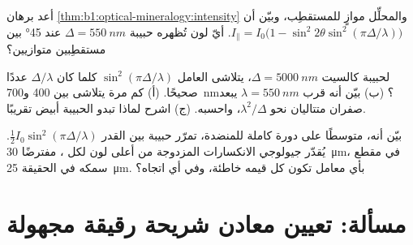 \begin{exercise}[$\star\star\star$]\label{exo:b1:optical-mineralogy:10}
أعد برهان \cref{thm:b1:optical-mineralogy:intensity} والمحلِّل موازٍ للمستقطِب، وبيّن أن
$I_\parallel = I_0\bigl(1 - \sin^2 2\theta\sin^2(\pi\Delta/\lambda)\bigr)$.
أيّ لون تُظهره حبيبة $\Delta = \qty{550}{nm}$ عند \ang{45} بين مستقطِبين متوازيين؟
\end{exercise}

\begin{exercise}[$\star\star\star$]\label{exo:b1:optical-mineralogy:11}
لحبيبة كالسيت $\Delta = \qty{5000}{nm}$، يتلاشى العامل $\sin^2(\pi\Delta/\lambda)$ كلما كان $\Delta/\lambda$ عددًا صحيحًا. (أ) كم مرة يتلاشى بين \num{400} و\qty{700}{nm}؟ (ب) بيّن أنه قرب $\lambda = \qty{550}{nm}$ يبعد صفران متتاليان نحو $\lambda^2/\Delta$، واحسبه. (ج) اشرح لماذا تبدو الحبيبة أبيض تقريبًا.
\end{exercise}

\begin{exercise}[$\star\star\star$]\label{exo:b1:optical-mineralogy:12}
بيّن أنه، متوسطًا على دورة كاملة للمنضدة، تمرّر حبيبة بين  القدر $\frac12 I_0\sin^2(\pi\Delta/\lambda)$. يُقدّر جيولوجي الانكسارات المزدوجة من أعلى لون لكل ، مفترضًا \qty{30}{\micro m}، في مقطع سمكه في الحقيقة \qty{25}{\micro m}. بأي معامل تكون كل قيمه خاطئة، وفي أي اتجاه؟
\end{exercise}

\section{مسألة: تعيين معادن شريحة رقيقة مجهولة}

